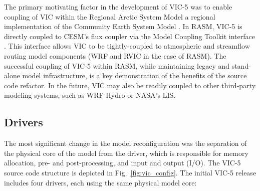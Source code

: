 \documentclass[gmd, manuscript]{copernicus}
\begin{document}
    The primary motivating factor in the development of VIC-5 was to enable coupling of VIC within the Regional Arctic System Model \citep[RASM;][]{Hamman_2016a} a regional implementation of the Community Earth System Model \citep[CESM;][]{Hurrell_2013}. In RASM, VIC-5 is directly coupled to CESM's flux coupler \citep[CPL7;][]{Craig_2012} via the Model Coupling Toolkit interface \citep[MCT;][]{Larson_2005}. This interface allows VIC to be tightly-coupled to atmospheric and streamflow routing model components (WRF and RVIC in the case of RASM). The successful coupling of VIC-5 within RASM, while maintaining legacy and stand-alone model infrastructure, is a key demonstration of the benefits of the source code refactor. In the future, VIC may also be readily coupled to other third-party modeling systems, such as WRF-Hydro or NASA's LIS.

  \subsection{Drivers}
    \label{sec:drivers}
    The most significant change in the model reconfiguration was the separation of the physical core of the model from the driver, which is responsible for memory allocation, pre- and post-processing, and input and output (I/O). The VIC-5 source code structure is depicted in Fig.~\ref{fig:vic_config}. The initial VIC-5 release includes four drivers, each using the same physical model core:
\end{document}
